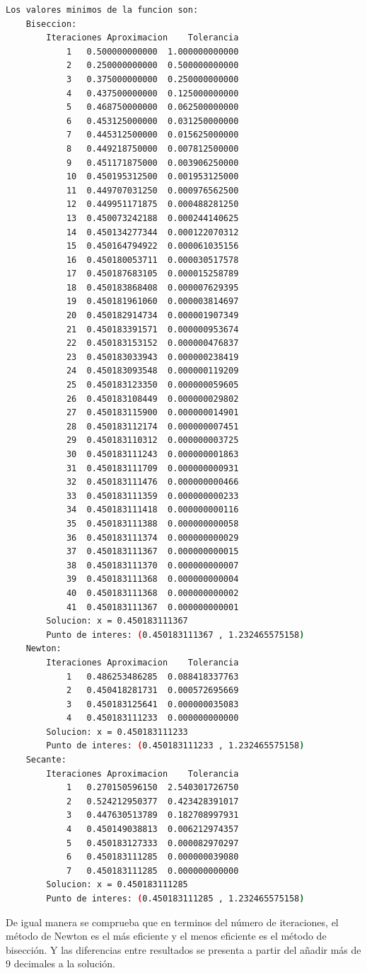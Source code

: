 \begin{lstlisting}[language=bash]
    Los valores minimos de la funcion son:
	Biseccion:
		Iteraciones	Aproximacion	Tolerancia
			1	0.500000000000	1.000000000000
			2	0.250000000000	0.500000000000
			3	0.375000000000	0.250000000000
			4	0.437500000000	0.125000000000
			5	0.468750000000	0.062500000000
			6	0.453125000000	0.031250000000
			7	0.445312500000	0.015625000000
			8	0.449218750000	0.007812500000
			9	0.451171875000	0.003906250000
			10	0.450195312500	0.001953125000
			11	0.449707031250	0.000976562500
			12	0.449951171875	0.000488281250
			13	0.450073242188	0.000244140625
			14	0.450134277344	0.000122070312
			15	0.450164794922	0.000061035156
			16	0.450180053711	0.000030517578
			17	0.450187683105	0.000015258789
			18	0.450183868408	0.000007629395
			19	0.450181961060	0.000003814697
			20	0.450182914734	0.000001907349
			21	0.450183391571	0.000000953674
			22	0.450183153152	0.000000476837
			23	0.450183033943	0.000000238419
			24	0.450183093548	0.000000119209
			25	0.450183123350	0.000000059605
			26	0.450183108449	0.000000029802
			27	0.450183115900	0.000000014901
			28	0.450183112174	0.000000007451
			29	0.450183110312	0.000000003725
			30	0.450183111243	0.000000001863
			31	0.450183111709	0.000000000931
			32	0.450183111476	0.000000000466
			33	0.450183111359	0.000000000233
			34	0.450183111418	0.000000000116
			35	0.450183111388	0.000000000058
			36	0.450183111374	0.000000000029
			37	0.450183111367	0.000000000015
			38	0.450183111370	0.000000000007
			39	0.450183111368	0.000000000004
			40	0.450183111368	0.000000000002
			41	0.450183111367	0.000000000001
		Solucion: x = 0.450183111367
		Punto de interes: (0.450183111367 , 1.232465575158)
	Newton:
		Iteraciones	Aproximacion	Tolerancia
			1	0.486253486285	0.088418337763
			2	0.450418281731	0.000572695669
			3	0.450183125641	0.000000035083
			4	0.450183111233	0.000000000000
		Solucion: x = 0.450183111233
		Punto de interes: (0.450183111233 , 1.232465575158)
	Secante:
		Iteraciones	Aproximacion	Tolerancia
			1	0.270150596150	2.540301726750
			2	0.524212950377	0.423428391017
			3	0.447630513789	0.182708997931
			4	0.450149038813	0.006212974357
			5	0.450183127333	0.000082970297
			6	0.450183111285	0.000000039080
			7	0.450183111285	0.000000000000
		Solucion: x = 0.450183111285
		Punto de interes: (0.450183111285 , 1.232465575158)
\end{lstlisting}

De igual manera se comprueba que en terminos del número de iteraciones, el método de Newton es el más eficiente y el menos eficiente es el método de bisección. Y las diferencias entre resultados se presenta a partir del añadir más de 9 decimales a la solución.

